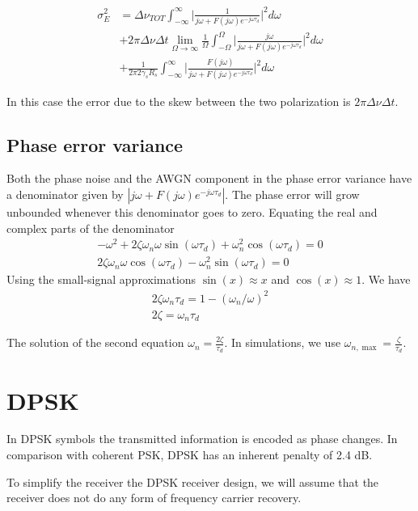 \documentclass[a4paper]{article}
\begin{document}
\begin{align} \nonumber
\sigma_E^2 &= \Delta\nu_{TOT}\int_{-\infty}^\infty \bigg|\frac{1}{j\omega +  F(j\omega)e^{-j\omega\tau_d}}\bigg|^2d\omega \\
& + 2\pi\Delta\nu\Delta t \lim_{\Omega\to\infty}\frac{1}{\Omega}\int_{-\Omega}^\Omega \bigg|\frac{j\omega}{j\omega +  F(j\omega)e^{-j\omega\tau_d}}\bigg|^2d\omega \\
&+ \frac{1}{2\pi 2\gamma_sR_s}\int_{-\infty}^\infty \bigg|\frac{F(j\omega)}{j\omega + F(j\omega)e^{-j\omega\tau_d}}\bigg|^2d\omega \nonumber
\end{align}

In this case the error due to the skew between the two polarization is $2\pi\Delta\nu\Delta t$.

\subsection{Phase error variance}

Both the phase noise and the AWGN component in the phase error variance have a denominator given by $|j\omega + F(j\omega)e^{-j\omega\tau_d}|$. The phase error will grow unbounded whenever this denominator goes to zero. Equating the real and complex parts of the denominator
\begin{align}
-\omega^2 + 2\zeta\omega_n\omega\sin(\omega\tau_d) + \omega_n^2\cos(\omega\tau_d) = 0 \\
2\zeta\omega_n\omega\cos(\omega\tau_d) - \omega_n^2\sin(\omega\tau_d) = 0
\end{align}
Using the small-signal approximations $\sin(x)\approx x$ and $\cos(x) \approx 1$. We have
\begin{align}
2\zeta\omega_n\tau_d = 1 - (\omega_n/\omega)^2 \\
2\zeta = \omega_n\tau_d
\end{align}

The solution of the second equation $\omega_n = \frac{2\zeta}{\tau_d}$. In simulations, we use $\omega_{n, \max} = \frac{\zeta}{\tau_d}$.

\section{DPSK}
In DPSK symbols the transmitted information is encoded as phase changes. In comparison with coherent PSK, DPSK has an inherent penalty of 2.4 dB.

To simplify the receiver the DPSK receiver design, we will assume that the receiver does not do any form of frequency carrier recovery. 
\end{document}
